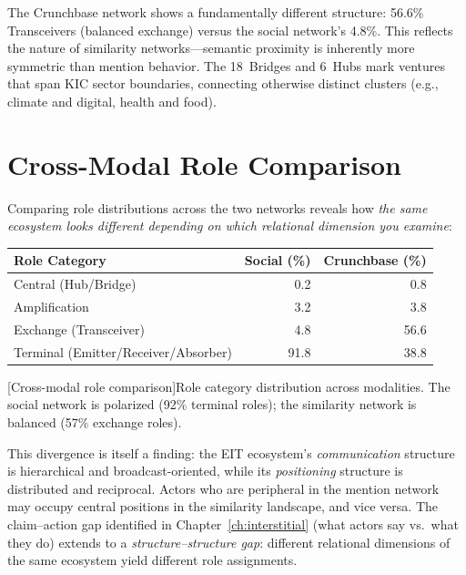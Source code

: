 \documentclass[../main.tex]{subfiles}
\begin{document}
The Crunchbase network shows a fundamentally different structure: 56.6\%
Transceivers (balanced exchange) versus the social network's 4.8\%.
This reflects the nature of similarity networks---semantic proximity is
inherently more symmetric than mention behavior. The 18~Bridges and
6~Hubs mark ventures that span KIC sector boundaries, connecting
otherwise distinct clusters (e.g., climate and digital, health and food).


\section*{Cross-Modal Role Comparison}

Comparing role distributions across the two networks reveals how
\emph{the same ecosystem looks different depending on which relational
dimension you examine}:

\begin{center}
\scriptsize
\begin{tabular}{@{}lrr@{}}
\toprule
\textbf{Role Category} & \textbf{Social (\%)} & \textbf{Crunchbase (\%)} \\
\midrule
Central (Hub/Bridge)     &  0.2 &  0.8 \\
Amplification            &  3.2 &  3.8 \\
Exchange (Transceiver)   &  4.8 & 56.6 \\
Terminal (Emitter/Receiver/Absorber) & 91.8 & 38.8 \\
\bottomrule
\end{tabular}
[Cross-modal role comparison]{Role category distribution
across modalities. The social network is polarized (92\% terminal roles);
the similarity network is balanced (57\% exchange roles).}
\end{center}

This divergence is itself a finding: the EIT ecosystem's \emph{communication}
structure is hierarchical and broadcast-oriented, while its
\emph{positioning} structure is distributed and reciprocal. Actors who are
peripheral in the mention network may occupy central positions in the
similarity landscape, and vice versa. The claim--action gap identified in
Chapter~\ref{ch:interstitial} (what actors say vs.\ what they do) extends
to a \emph{structure--structure gap}: different relational dimensions
of the same ecosystem yield different role assignments.
\end{document}
